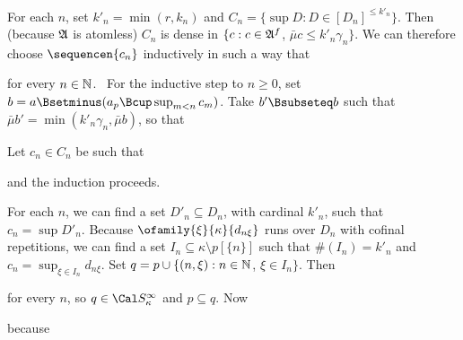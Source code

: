 {For each $n$, set $k'_n=\min(r,k_n)$ and
$C_n=\{\sup D:D\in[D_n]^{\le k'_n}\}$.
Then (because $\frak A$ is atomless) $C_n$ is dense in
$\{c:c\in\frak A^f$, $\bar\mu c\le k'_n\gamma_n\}$.   We can therefore
choose $\sequencen{c_n}$ inductively in such a way that



\noindent for every $n\in\Bbb N$.   \Prf\
For the inductive step to $n\ge 0$, set
$b=a\Bsetminus(a_p\Bcup\sup_{m<n}c_m)$.   Take $b'\Bsubseteq b$ such that
$\bar\mu b'=\min(k'_n\gamma_n,\bar\mu b)$, so that



\noindent Let $c_n\in C_n$ be such that



\noindent and the induction proceeds.\ \Qed

For each $n$, we can find a set $D'_n\subseteq D_n$, with cardinal{} $k'_n$,
such that $c_n=\sup D'_n$.   Because $\ofamily{\xi}{\kappa}{d_{n\xi}}$
runs over $D_n$ with cofinal repetitions, we can find a set
$I_n\subseteq\kappa\setminus p[\{n\}]$ such that $\#(I_n)=k'_n$ and
$c_n=\sup_{\xi\in I_n}d_{n\xi}$.   Set
$q=p\cup\{(n,\xi):n\in\Bbb N$, $\xi\in I_n\}$.   Then


\noindent for every $n$, so $q\in\Cal S_{\kappa}^{\infty}$ and
$p\subseteq q$.    Now


\noindent because


}
